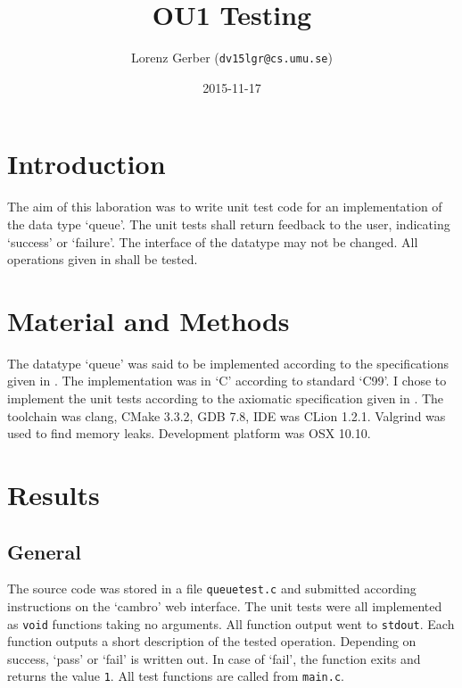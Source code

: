 \documentclass[a4paper,11pt,twoside]{article}
\title{OU1 Testing}
\author{Lorenz Gerber  ({\tt{dv15lgr@cs.umu.se}})}
\date{2015-11-17}
\begin{document}
\maketitle

\tableofcontents
\newpage

\section{Introduction} 
The aim of this laboration was to write unit test code for an
implementation of the data type `queue'. The unit tests shall 
return feedback to the user, indicating `success' or `failure'. The
interface of the datatype may not be changed. All operations given in
\cite[p. 155]{janlert2000} shall be tested.

\section{Material and Methods} 
The datatype `queue' was said to be implemented according to the 
specifications given in \cite[pp.155 -- 172]{janlert2000}. The
implementation was in `C' according to standard `C99'. I chose to 
implement the unit tests according to the axiomatic specification 
given in \cite[pp.156 + 157]{janlert2000}. The toolchain was clang, 
CMake 3.3.2, GDB 7.8, IDE was CLion 1.2.1. Valgrind was used to 
find memory leaks. Development platform was OSX 10.10. 

\section{Results}
\subsection{General}
The source code was stored in a file \texttt{queuetest.c} and submitted
according instructions on the `cambro' web interface. The unit tests were
all implemented as \texttt{void} functions taking no arguments. All function
output went to \texttt{stdout}. Each function outputs a short description of 
the tested operation. Depending on success, `pass' or `fail' is written
out. In case of `fail', the function exits and returns the value
\texttt{1}. All test functions are called from \texttt{main.c}. 
\end{document}
